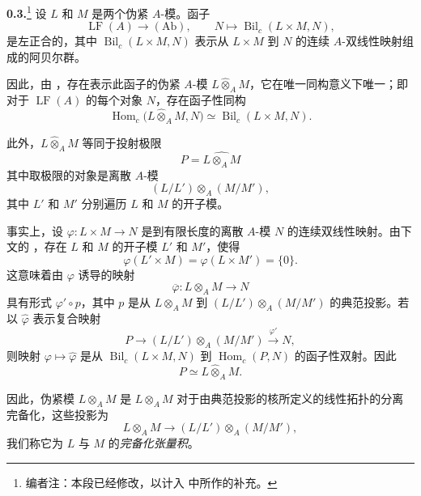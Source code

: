 
\medskip
\noindent\textbf{0.3.}\footnote{编者注：本段已经修改，以计入  中所作的补充。}
\label{sga3:VIIB:0.3}
设 \(L\) 和 \(M\) 是两个伪紧 \(A\)-模。函子
\[
  \operatorname{LF}(A)\longrightarrow(\mathrm{Ab}),
  \qquad
  N\longmapsto\operatorname{Bil}_{c}(L\times M,N),
\]
是左正合的，其中 \(\operatorname{Bil}_{c}(L\times M,N)\) 表示从
\(L\times M\) 到 \(N\) 的连续 \(A\)-双线性映射组成的阿贝尔群。

因此，由 ，存在表示此函子的伪紧 \(A\)-模
\(L\widehat{\otimes}_{A}M\)，它在唯一同构意义下唯一；即对于
\(\operatorname{LF}(A)\) 的每个对象 \(N\)，存在函子性同构
\[
  \operatorname{Hom}_{c}
    \bigl(L\widehat{\otimes}_{A}M,N\bigr)
  \simeq
  \operatorname{Bil}_{c}(L\times M,N).
\]

此外，\(L\widehat{\otimes}_{A}M\) 等同于投射极限
\[
  P=\widehat{L\otimes_{A}M}
\]
其中取极限的对象是离散 \(A\)-模
\[
  (L/L')\otimes_{A}(M/M'),
\]
其中 \(L'\) 和 \(M'\) 分别遍历 \(L\) 和 \(M\) 的开子模。

事实上，设 \(\varphi:L\times M\to N\) 是到有限长度的离散
\(A\)-模 \(N\) 的连续双线性映射。由下文的
，存在 \(L\) 和 \(M\) 的开子模
\(L'\) 和 \(M'\)，使得
\[
  \varphi(L'\times M)=\varphi(L\times M')=\{0\}.
\]
这意味着由 \(\varphi\) 诱导的映射
\[
  \overline{\varphi}:L\otimes_{A}M\longrightarrow N
\]
具有形式 \(\varphi'\circ p\)，其中 \(p\) 是从 \(L\otimes_{A}M\) 到
\((L/L')\otimes_{A}(M/M')\) 的典范投影。若以 \(\widehat{\varphi}\) 表示复合映射
\[
  P
  \longrightarrow
  (L/L')\otimes_{A}(M/M')
  \xrightarrow{\ \varphi'\ }
  N,
\]
则映射 \(\varphi\mapsto\widehat{\varphi}\) 是从
\(\operatorname{Bil}_{c}(L\times M,N)\) 到 \(\operatorname{Hom}_{c}(P,N)\)
的函子性双射。因此
\[
  P\simeq L\widehat{\otimes}_{A}M.
\]

因此，伪紧模 \(L\widehat{\otimes}_{A}M\) 是 \(L\otimes_{A}M\)
对于由典范投影的核所定义的线性拓扑的分离完备化，这些投影为
\[
  L\otimes_{A}M
  \longrightarrow
  (L/L')\otimes_{A}(M/M'),
\]
我们称它为 \(L\) 与 \(M\) 的\emph{完备化张量积}。

